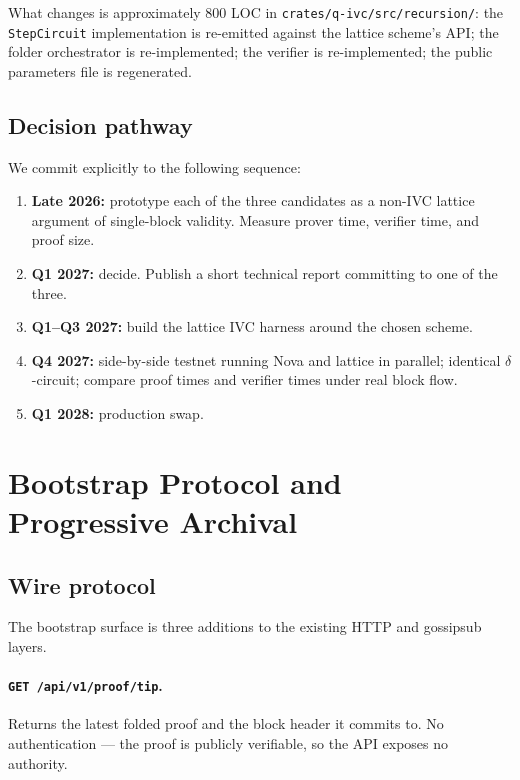\documentclass[11pt,a4paper]{article}
\begin{document}
What changes is approximately 800 LOC in
\texttt{crates/q-ivc/src/recursion/}: the \texttt{StepCircuit}
implementation is re-emitted against the lattice scheme's API; the
folder orchestrator is re-implemented; the verifier is re-implemented;
the public parameters file is regenerated.

\subsection{Decision pathway}

We commit explicitly to the following sequence:

\begin{enumerate}[leftmargin=*]
  \item \textbf{Late 2026:} prototype each of the three candidates as a
        non-IVC lattice argument of single-block validity. Measure
        prover time, verifier time, and proof size.
  \item \textbf{Q1 2027:} decide. Publish a short technical report
        committing to one of the three.
  \item \textbf{Q1--Q3 2027:} build the lattice IVC harness around the
        chosen scheme.
  \item \textbf{Q4 2027:} side-by-side testnet running Nova and lattice
        in parallel; identical $\delta$-circuit; compare proof times
        and verifier times under real block flow.
  \item \textbf{Q1 2028:} production swap.
\end{enumerate}

\section{Bootstrap Protocol and Progressive Archival}
\label{sec:bootstrap}

\subsection{Wire protocol}

The bootstrap surface is three additions to the existing HTTP and
gossipsub layers.

\paragraph{\texttt{GET /api/v1/proof/tip}.}
Returns the latest folded proof and the block header it commits to.
No authentication --- the proof is publicly verifiable, so the API
exposes no authority.
\end{document}
